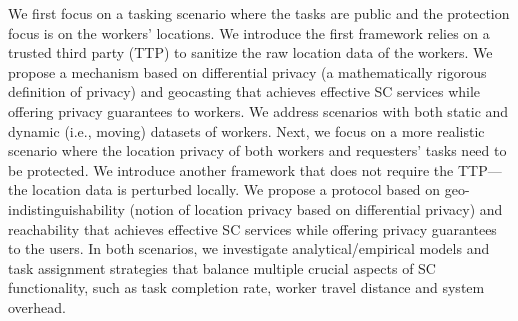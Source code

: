 \documentclass{USC-Thesis}
\numberwithin{equation}{chapter}
\begin{document}
We first focus on a tasking scenario where the tasks are public and the protection focus is on the workers' locations. We introduce the first framework relies on a trusted third party (TTP) to sanitize the raw location data of the workers. We propose a mechanism based on differential privacy (a mathematically rigorous definition of privacy) and geocasting that achieves effective SC services while offering privacy guarantees to workers. We address scenarios with both static and dynamic (i.e., moving) datasets of workers. Next, we focus on a more realistic scenario where the location privacy of both workers and requesters' tasks need to be protected. We introduce another framework that does not require the TTP---the location data is perturbed locally. We propose a protocol based on geo-indistinguishability (notion of location privacy based on differential privacy) and reachability that achieves effective SC services while offering privacy guarantees to the users. In both scenarios, we investigate analytical/empirical models and task assignment strategies that balance multiple crucial aspects of SC functionality, such as task completion rate, worker travel distance and system overhead.

\end{document}

